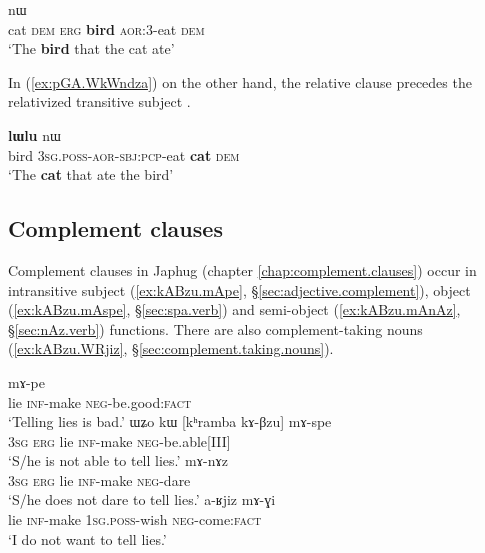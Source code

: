 \begin{exe}
\ex \label{ex:lWlu.nW.kW.tAkAndza}
 nɯ  \\
cat \textsc{dem} \textsc{erg} \textbf{bird} \textsc{aor}:3\flobv{}-eat \textsc{dem}   \\
\glt `The \textbf{bird} that the cat ate' 
\end{exe}

In (\ref{ex:pGA.WkWndza}) on the other hand, the relative clause precedes the relativized transitive subject .

\begin{exe}
\ex \label{ex:pGA.WkWndza}
 \textbf{lɯlu} nɯ   \\
bird \textsc{3sg}.\textsc{poss}-\textsc{aor}-\textsc{sbj}:\textsc{pcp}-eat \textbf{cat} \textsc{dem}  \\
\glt `The \textbf{cat} that ate the bird' 
\end{exe}

\subsection{Complement clauses}
Complement clauses in Japhug (chapter \ref{chap:complement.clauses}) occur in intransitive subject (\ref{ex:kABzu.mApe}, §\ref{sec:adjective.complement}), object (\ref{ex:kABzu.mAspe}, §\ref{sec:spa.verb}) and semi-object (\ref{ex:kABzu.mAnAz}, §\ref{sec:nAz.verb}) functions. There are also com\-ple\-ment-taking nouns (\ref{ex:kABzu.WRjiz}, §\ref{sec:complement.taking.nouns}).

\begin{exe} 
\ex \label{ex:kABzu.complements}
\begin{xlist}
\ex \label{ex:kABzu.mApe}
 mɤ-pe \\
lie \textsc{inf}-make \textsc{neg}-be.good:\textsc{fact} \\
\glt `Telling lies is bad.' 
\ex \label{ex:kABzu.mAspe}
\gll ɯʑo kɯ [kʰramba kɤ-βzu] mɤ-spe \\
\textsc{3sg} \textsc{erg} lie \textsc{inf}-make \textsc{neg}-be.able[III] \\
\glt `S/he is not able to tell lies.' 
\ex \label{ex:kABzu.mAnAz}
 mɤ-nɤz \\
\textsc{3sg} \textsc{erg} lie \textsc{inf}-make \textsc{neg}-dare \\
\glt `S/he does not dare to tell lies.' 
\ex \label{ex:kABzu.WRjiz}
 a-ʁjiz mɤ-ɣi \\
lie \textsc{inf}-make \textsc{1sg}.\textsc{poss}-wish \textsc{neg}-come:\textsc{fact} \\
\glt `I do not want to tell lies.' 
\end{xlist}
\end{exe} 


